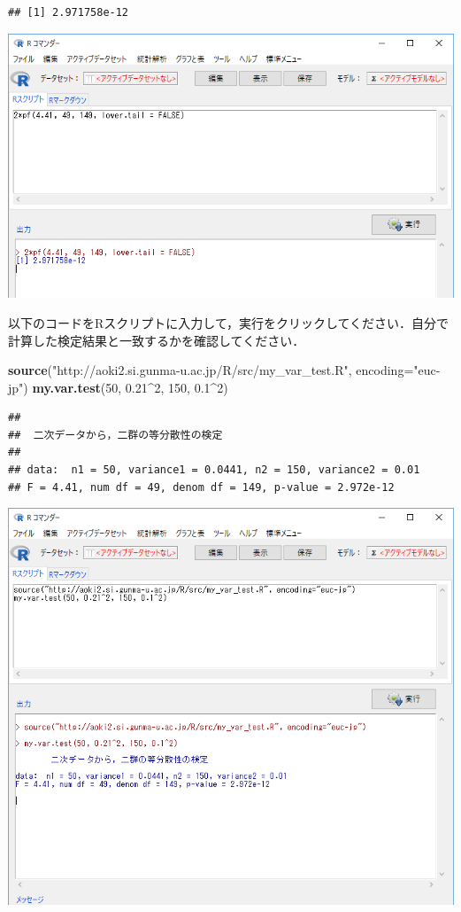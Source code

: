 \documentclass[11pt,]{problemset}
\newenvironment{Shaded}{\begin{snugshade}}{\end{snugshade}}
\newcommand{\DataTypeTok}[1]{\textcolor[rgb]{0.13,0.29,0.53}{#1}}
\newcommand{\DecValTok}[1]{\textcolor[rgb]{0.00,0.00,0.81}{#1}}
\newcommand{\FloatTok}[1]{\textcolor[rgb]{0.00,0.00,0.81}{#1}}
\newcommand{\KeywordTok}[1]{\textcolor[rgb]{0.13,0.29,0.53}{\textbf{#1}}}
\newcommand{\NormalTok}[1]{#1}
\newcommand{\OperatorTok}[1]{\textcolor[rgb]{0.81,0.36,0.00}{\textbf{#1}}}
\newcommand{\StringTok}[1]{\textcolor[rgb]{0.31,0.60,0.02}{#1}}
\begin{document}
\begin{verbatim}
## [1] 2.971758e-12
\end{verbatim}

\begin{center}\includegraphics[width=0.9\linewidth]{pic/ftest} \end{center}
\bigskip

以下のコードをRスクリプトに入力して，実行をクリックしてください．自分で計算した検定結果と一致するかを確認してください．

\begin{Shaded}
\begin{Highlighting}[]
\KeywordTok{source}\NormalTok{(}\StringTok{"http://aoki2.si.gunma-u.ac.jp/R/src/my_var_test.R"}\NormalTok{, }\DataTypeTok{encoding=}\StringTok{"euc-jp"}\NormalTok{)}
\KeywordTok{my.var.test}\NormalTok{(}\DecValTok{50}\NormalTok{, }\FloatTok{0.21}\OperatorTok{^}\DecValTok{2}\NormalTok{, }\DecValTok{150}\NormalTok{, }\FloatTok{0.1}\OperatorTok{^}\DecValTok{2}\NormalTok{)}
\end{Highlighting}
\end{Shaded}

\begin{verbatim}
## 
##  二次データから，二群の等分散性の検定
## 
## data:  n1 = 50, variance1 = 0.0441, n2 = 150, variance2 = 0.01
## F = 4.41, num df = 49, denom df = 149, p-value = 2.972e-12
\end{verbatim}

\begin{center}\includegraphics[width=0.9\linewidth]{pic/ftest01} \end{center}
\bigskip
\end{document}
